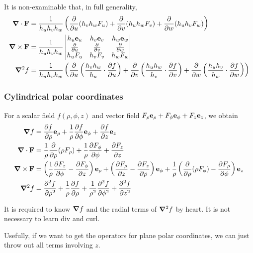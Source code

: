 \documentclass{../template/note}
\begin{document}
    It is non-examinable that, in full generality,
    \begin{align*}
        \div \V F &= \frac{1}{h_uh_vh_w} \left(\pd{}{u}(h_vh_wF_u)+\pd{}{v}(h_uh_wF_v)+\pd{}{w}(h_uh_vF_w)\right) \\
        \curl \V F &= \frac{1}{h_uh_vh_w} \begin{vmatrix}
         h_u \V e_u & h_v \V e_v & h_w \V e_w \\
         \pd{}{u} & \pd{}{v} & \pd{}{w} \\
         h_uF_u & h_vF_v & h_wF_w \\
        \end{vmatrix} \\
        \grad^2 f &= \frac{1}{h_uh_vh_w} \left(\pd{}{u} \left(\frac{h_vh_w}{h_u} \cdot \pd{f}{u}\right) + \pd{}{v} \left(\frac{h_uh_w}{h_v} \cdot \pd{f}{v}\right) + \pd{}{w} \left(\frac{h_uh_v}{h_w} \cdot \pd{f}{w}\right)\right)
    \end{align*}
    
    

    \subsubsection{Cylindrical polar coordinates}
    
    For a scalar field \(f(\rho, \phi, z)\) and vector field \(F_\rho \V e_\rho + F_\phi \V e_\phi + F_z \V e_z\), we obtain
    \begin{align*}
        \grad f &= \pd f \rho \V e_\rho + \frac 1 \rho \pd f \phi \V e_\phi + \pd f z \V e_z \\
        \div \V F &= \frac 1 \rho \pd{}\rho(\rho F_\rho) + \frac 1 \rho \pd{F_\phi}{\phi} + \pd{F_z}{z} \\
        \curl \V F &= \left(\frac 1 \rho \pd{F_z}{\phi} - \pd{F_\phi}{z}\right)\V e_\rho + \left(\pd{F_\rho}z - \pd{F_z}\rho\right)\V e_\phi + \frac 1 \rho \left(\pd{}{\rho}(\rho F_\phi)-\pd{F_\rho}{\phi}\right)\V e_z \\
        \grad^2f &= \pd{^2f}{\rho^2} + \frac 1 \rho \pd{f}{\rho} + \frac 1 {\rho^2} \pd{^2f}{\phi^2} + \pd{^2f}{z^2}
    \end{align*}

    It is required to know \(\grad f\) and the radial terms of \(\grad^2 f\) by heart. It is not necessary to learn div and curl.
    
    Usefully, if we want to get the operators for plane polar coordinates, we can just throw out all terms involving \(z\).
\end{document}
